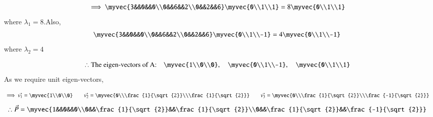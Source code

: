 \documentclass[journal]{IEEEtran}
\begin{document}
\begin{align}
    \implies \myvec{3&&0&&0\\0&&6&&2\\0&&2&&6}\myvec{0\\1\\1}=8\myvec{0\\1\\1}
\end{align}
where $\lambda_1=8$.Also,
\begin{align}
    \myvec{3&&0&&0\\0&&6&&2\\0&&2&&6}\myvec{0\\1\\-1}=4\myvec{0\\1\\-1}
\end{align}
where $\lambda_2=4$

\begin{align}
    \therefore \text{The eigen-vectors of A:}\quad \myvec{1\\0\\0},\quad \myvec{0\\1\\-1},\quad \myvec{0\\1\\1}
\end{align}
As we require unit eigen-vectors,

\begin{align}
    \implies \vec{v_1}=\myvec{1\\0\\0} \qquad \vec{v_2}=\myvec{0\\\frac{1}{\sqrt{2}}\\\frac{1}{\sqrt{2}}} \qquad \vec{v_3}=\myvec{0\\\frac{1}{\sqrt{2}}\\\frac{-1}{\sqrt{2}}}
\end{align}
\begin{align}
    \therefore \vec{P}=\myvec{1&&0&&0\\0&&\frac{1}{\sqrt{2}}&&\frac{1}{\sqrt{2}}\\0&&\frac{1}{\sqrt{2}}&&\frac{-1}{\sqrt{2}}}
\end{align}
\end{document}
